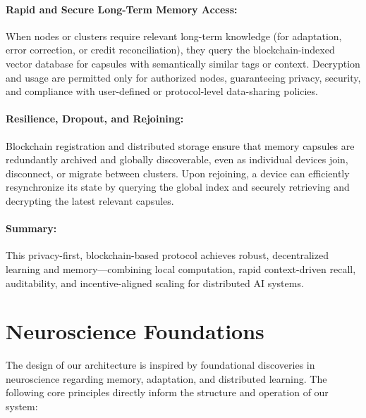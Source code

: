 \documentclass[11pt]{article}
\begin{document}
\paragraph{Rapid and Secure Long-Term Memory Access:}
When nodes or clusters require relevant long-term knowledge (for adaptation, error correction, or credit reconciliation), they query the blockchain-indexed vector database for capsules with semantically similar tags or context. Decryption and usage are permitted only for authorized nodes, guaranteeing privacy, security, and compliance with user-defined or protocol-level data-sharing policies.

\paragraph{Resilience, Dropout, and Rejoining:}
Blockchain registration and distributed storage ensure that memory capsules are redundantly archived and globally discoverable, even as individual devices join, disconnect, or migrate between clusters. Upon rejoining, a device can efficiently resynchronize its state by querying the global index and securely retrieving and decrypting the latest relevant capsules.

\paragraph{Summary:}
This privacy-first, blockchain-based protocol achieves robust, decentralized learning and memory—combining local computation, rapid context-driven recall, auditability, and incentive-aligned scaling for distributed AI systems.


\section{Neuroscience Foundations}

The design of our architecture is inspired by foundational discoveries in neuroscience regarding memory, adaptation, and distributed learning. The following core principles directly inform the structure and operation of our system:
\end{document}
